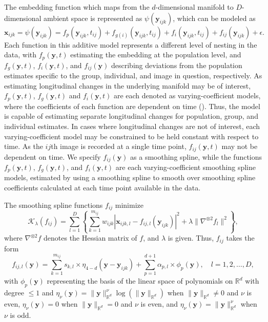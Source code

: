 \documentclass[11pt,reqno]{article}
\theoremstyle{definition}
\begin{document}
The embedding function which maps from the $d$-dimensional manifold to $D$-dimensional ambient space is represented as $\psi(\mathbf{y}_{ijk})$, which can be modeled as 
\begin{equation}
  \mathbf{x}_{ijk} = \psi(\mathbf{y}_{ijk}) = f_p(\mathbf{y}_{ijk}, t_{ij}) + f_{g(i)}(\mathbf{y}_{ijk}, t_{ij}) + f_i(\mathbf{y}_{ijk}, t_{ij}) + f_{ij}(\mathbf{y}_{ijk}) + \epsilon. \label{eq:2}
\end{equation}
Each function in this additive model represents a different level of nesting in the data, with $f_p(\mathbf{y}, t)$ estimating the embedding at the population level, and $f_g(\mathbf{y}, t)$, $f_i(\mathbf{y}, t)$, and $f_{ij}(\mathbf{y})$ describing deviations from the population estimates specific to the group, individual, and image in question, respectively. As estimating longitudinal changes in the underlying manifold may be of interest, $f_p(\mathbf{y}, t)$, $f_g(\mathbf{y}, t)$ and $f_i(\mathbf{y}, t)$ are each denoted as varying-coefficient models, where the coefficients of each function are dependent on time (\cite{hastieVaryingCoefficientModels1993}). Thus, the model is capable of estimating separate longitudinal changes for population, group, and individual estimates. In cases where longitudinal changes are not of interest, each varying-coefficient model may be constrained to be held constant with respect to time. As the $ij$th image is recorded at a single time point, $f_{ij}(\mathbf{y}, t)$ may not be dependent on time. We specify $f_{ij}(\mathbf{y})$ as a smoothing spline, while the functions $f_p(\mathbf{y}, t)$, $f_g(\mathbf{y}, t)$, and $f_i(\mathbf{y}, t)$ are each varying-coefficient smoothing spline models, estimated by using a smoothing spline to smooth over smoothing spline coefficients calculated at each time point available in the data. 

The smoothing spline functions $f_{ij}$ minimize 
\begin{equation}
  \mathcal{K}_{\lambda}(f_{ij}) = \sum_{l=1}^{D}\left\{\sum_{k=1}^{m_{ij}}w_{ijk}|\mathbf{x}_{ijk, l} - f_{ij, l}(\mathbf{y}_{ijk})|^2 + \lambda\|\nabla^{\otimes 2}f_l\|^2\right\}, \label{eq:3}
\end{equation}
where $\nabla^{\otimes 2}f$ denotes the Hessian matrix of $f$, and $\lambda$ is given. Thus, $f_{ij}$ takes the form
\begin{equation}
  f_{ij, l}(\mathbf{y}) = \sum_{k=1}^{m_{ij}} s_{k, l} \times \eta_{4-d}\left(\mathbf{y} - \mathbf{y}_{ijk}\right) + \sum_{p=1}^{d+1} \alpha_{p, l} \times \phi_p(\mathbf{y}), \quad l = 1, 2, \dots, D, \label{eq:4}
\end{equation}
with $\phi_p(\mathbf{y})$ representing the basis of the linear space of polynomials on $\mathbb{R}^{d}$ with degree $\leq 1$ and $\eta_{\nu}(\mathbf{y}) = \|\mathbf{y}\|_{\mathbb{R}^{d}}^{\nu}\log\left(\|\mathbf{y}\|_{\mathbb{R}^{d}}\right)$ when $\|\mathbf{y}\|_{\mathbb{R}^{d}} \neq 0$ and $\nu$ is even, $\eta_{\nu}(\mathbf{y}) = 0$ when $\|\mathbf{y}\|_{\mathbb{R}^{d}} = 0$ and $\nu$ is even, and $\eta_{\nu}(\mathbf{y}) = \|\mathbf{y}\|_{\mathbb{R}^{d}}^{\nu}$ when $\nu$ is odd. 
\end{document}
